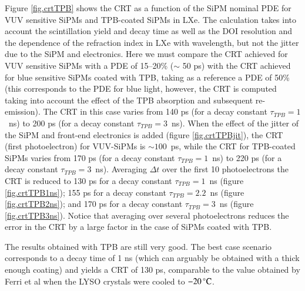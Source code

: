 \documentclass[review]{elsarticle}
\begin{document}
Figure \ref{fig.crtTPB} shows the CRT as a function of the
 SiPM nominal PDE for VUV sensitive SiPMs and TPB-coated SiPMs in LXe. 
 The calculation takes into account the scintillation yield and decay time as well as the DOI resolution and the dependence of the refraction index in LXe with wavelength, but not the jitter due to the SiPM and electronics. 
 Here we must compare the CRT achieved for VUV sensitive SiPMs with a PDE of 15--20\% ($\sim$ 50 ps) with the CRT achieved for blue sensitive SiPMs coated with TPB, taking as a reference a PDE of 50\% (this corresponds to the
 PDE for blue light,  however, the CRT is computed taking into account the effect of the TPB absorption and subsequent re-emission).  The CRT in this case varies from 140 ps (for a decay constant $\tau_{TPB} = 1$~ns) to 
 200 ps (for a decay constant $\tau_{TPB} = 3$~ns).  When the effect of the jitter of the SiPM and front-end electronics is added (figure \ref{fig.crtTPBjit}), the CRT (first photoelectron) for VUV-SiPMs is $\sim 100$~ps, while the CRT for TPB-coated SiPMs varies from
 170 ps (for a decay constant $\tau_{TPB} = 1$~ns) to 
 220 ps (for a decay constant $\tau_{TPB} = 3$~ns). Averaging $\Delta t$ over the first 10 photoelectrons 
 the CRT is reduced to 130 ps for a decay constant $\tau_{TPB} = 1$~ns (figure \ref{fig.crtTPB1ns});
 155 ps for a decay constant $\tau_{TPB} = 2.2$~ns (figure \ref{fig.crtTPB2ns});  and
 170 ps for a decay constant $\tau_{TPB} = 3$~ns (figure \ref{fig.crtTPB3ns}). Notice that averaging over 
 several photoelectrons reduces the error in the CRT by a large factor in the case of SiPMs coated with TPB. 
 
 The results obtained with TPB are still very good. The best case scenario corresponds to a decay time of 1 ns
 (which can arguably be obtained with a thick enough coating) and yields a CRT of 130 ps, comparable to the value
 obtained by Ferri et al  \cite{LysoFBK}  when the LYSO crystals were cooled 
to $-20\,^{\circ}{\rm C}$.
    
\end{document}
